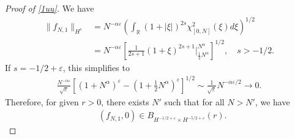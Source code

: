 \documentclass[12pt,reqno]{amsart}
\numberwithin{equation}{section}  %
\newcommand{\rr}{\mathbb{R}}
\newcommand{\ee}{\varepsilon}
\begin{document}
%
%
%
%
%
%
%
%
%
%
%
\begin{proof}[Proof of \ref{1uu}]
    We have
%
\begin{equation}
  \label{ill-pos-ce}
  \begin{split}
    \| f_{N,1} \|_{H^{s}}
    & = 
    N^{-\alpha \ee}\left( \int_{\rr} (1 + | \xi |)^{2s} \chi_{[0,N]}^{2}(\xi
    ) d \xi \right)^{1/2}
    \\
    & = N^{- \alpha \ee}
    \left[ \frac{1}{2s+1} (1 +  \xi )^{2s+1} \big
    |_{\frac{1}{2}N^{\alpha}}^{N^{\alpha}} \right]^{1/2},
    \quad s > -1/2.
\end{split}
\end{equation}
%
%
If $s = -1/2 + \ee$, this simplifies to
%
%
\begin{equation*}
\begin{split}
  \frac{N^{-\alpha \ee}}{\sqrt{\ee}}\left[ (1 + N^{\alpha})^{\ee} - (1 +
  \frac{1}{2}N^{\alpha})^{\ee} \right]^{1/2} \sim \frac{1}{\sqrt{\ee}}N^{-\alpha \ee/2}
  \to 0.
  \end{split}
\end{equation*}
%
%
Therefore, for given $r > 0$, there exists $N'$ such that for all $N > N'$, we
have
%
%
\begin{equation*}
  \begin{split}
    & (f_{N,1}, 0) \in B_{H^{-1/2 + \ee} \times H^{-5/2 + \ee}}(r).
  \end{split}
\end{equation*}
\end{proof}
%
%
%
\end{document}
